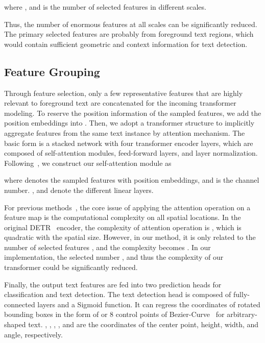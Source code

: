 \documentclass[10pt,twocolumn,letterpaper]{article}
\begin{document}
where , and  is the number of selected features in different scales.

Thus, the number of enormous features at all scales can be significantly reduced.
The primary selected features are probably from foreground text regions, which would contain sufficient geometric and context information for text detection.

\subsection{Feature Grouping}
Through feature selection, only a few representative features that are highly relevant to foreground text are concatenated for the incoming transformer modeling.
To reserve the position information of the sampled features,
we add the position embeddings into .
Then, we adopt a transformer structure to implicitly aggregate features from the same text instance by attention mechanism.
The basic form is a stacked network with four transformer encoder layers, which are composed of self-attention modules, feed-forward layers, and layer normalization.
Following~\cite{transformer}, we construct our self-attention module as

where  denotes the sampled features with position embeddings, and  is the channel number. ,  and  denote the different linear layers.

For previous methods~\cite{carion2020detr,meng2021conditional}, the core issue of applying the attention operation on a feature map  is the computational complexity on all spatial locations.
In the original DETR~\cite{carion2020detr} encoder, the complexity of attention operation is , which is quadratic with the spatial size.
However, in our method, it is only related to the number  of selected features , and the complexity becomes . 
In our implementation, the selected number , and thus the complexity of our transformer could be significantly reduced.





Finally, the output text features are fed into two prediction heads for classification and text detection.
The text detection head is composed of fully-connected layers and a Sigmoid function.
It can regress the coordinates of rotated bounding boxes in the form of  or 8 control points of Bezier-Curve~\cite{abcnet} for arbitrary-shaped text.
, , , , and  are the coordinates of the center point, height, width, and angle, respectively.
\end{document}
